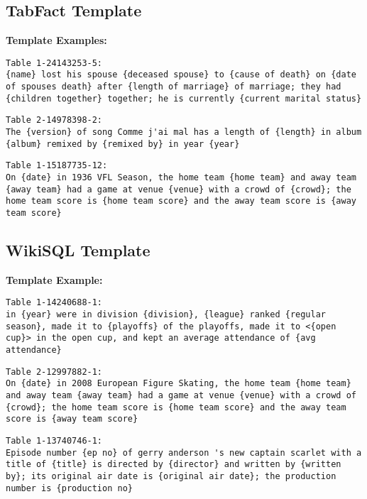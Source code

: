\documentclass[11pt]{article}
\begin{document}
\subsection{TabFact Template}

\textbf{Template Examples:}

\begin{lstlisting}
Table 1-24143253-5:
{name} lost his spouse {deceased spouse} to {cause of death} on {date of spouses death} after {length of marriage} of marriage; they had {children together} together; he is currently {current marital status}
\end{lstlisting}

\begin{lstlisting}
Table 2-14978398-2:
The {version} of song Comme j'ai mal has a length of {length} in album {album} remixed by {remixed by} in year {year}
\end{lstlisting}

\begin{lstlisting}
Table 1-15187735-12:
On {date} in 1936 VFL Season, the home team {home team} and away team {away team} had a game at venue {venue} with a crowd of {crowd}; the home team score is {home team score} and the away team score is {away team score}
\end{lstlisting}

\subsection{WikiSQL Template}

\textbf{Template Example:}

\begin{lstlisting}
Table 1-14240688-1:
in {year} were in division {division}, {league} ranked {regular season}, made it to {playoffs} of the playoffs, made it to <{open cup}> in the open cup, and kept an average attendance of {avg attendance}
\end{lstlisting}

\begin{lstlisting}
Table 2-12997882-1:
On {date} in 2008 European Figure Skating, the home team {home team} and away team {away team} had a game at venue {venue} with a crowd of {crowd}; the home team score is {home team score} and the away team score is {away team score}
\end{lstlisting}

\begin{lstlisting}
Table 1-13740746-1:
Episode number {ep no} of gerry anderson 's new captain scarlet with a title of {title} is directed by {director} and written by {written by}; its original air date is {original air date}; the production number is {production no}
\end{lstlisting} 
\end{document}
